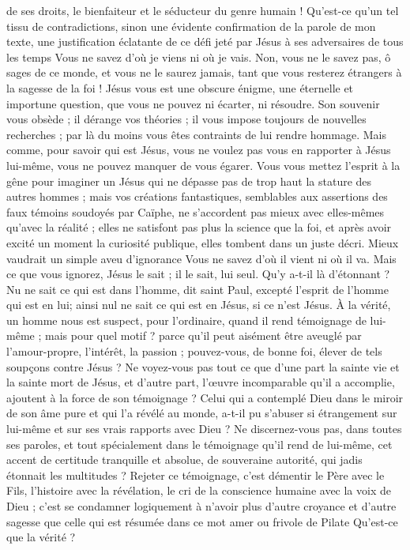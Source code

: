 de ses droits, le bienfaiteur et le séducteur du genre humain ! Qu’est-ce qu’un tel tissu de contradictions, sinon une évidente confirmation de la parole de mon texte, une justification éclatante de ce défi jeté par Jésus à ses adversaires de tous les temps\frcolon{} \Og{} Vous ne savez d’où je viens ni où je vais.\Fg{} Non, vous ne le savez pas, ô sages de ce monde, et vous ne le saurez jamais, tant que vous resterez étrangers à la sagesse de la foi ! Jésus vous est une obscure énigme, une éternelle et importune question, que vous ne pouvez ni écarter, ni résoudre. Son souvenir vous obsède ; il dérange vos théories ; il vous impose toujours de nouvelles recherches ; par là du moins vous êtes contraints de lui rendre hommage. Mais comme, pour savoir qui est Jésus, vous ne voulez pas vous en rapporter à Jésus lui-même, vous ne pouvez manquer de vous égarer. Vous vous mettez l’esprit à la gêne pour imaginer un Jésus qui ne dépasse pas de trop haut la stature des autres hommes ; mais vos créations fantastiques, semblables aux assertions des faux témoins soudoyés par Caïphe, ne s’accordent pas mieux avec elles-mêmes qu’avec la réalité ; elles ne satisfont pas plus la science que la foi, et après avoir excité un moment la curiosité publique, elles tombent dans un juste décri. Mieux vaudrait un simple aveu d’ignorance\frcolon{} Vous ne savez d’où il vient ni où il va. Mais ce que vous ignorez, Jésus le sait ; il le sait, lui seul. Qu’y a-t-il là d’étonnant ? \Og{} Nu ne sait ce qui est dans l’homme, dit saint Paul, excepté l’esprit de l’homme qui est en lui\Fg{}; ainsi nul ne sait ce qui est en Jésus, si ce n’est Jésus. À la vérité, un homme nous est suspect, pour l’ordinaire, quand il rend témoignage de lui-même ; mais pour quel motif ? parce qu’il peut aisément être aveuglé par l’amour-propre, l’intérêt, la passion ; pouvez-vous, de bonne foi, élever de tels soupçons contre Jésus ? Ne voyez-vous pas tout ce que d’une part la sainte vie et la sainte mort de Jésus, et d’autre part, l’œuvre incomparable qu’il a accomplie, ajoutent à la force de son témoignage ? Celui qui a contemplé Dieu dans le miroir de son âme pure et qui l’a révélé au monde, a-t-il pu s’abuser si étrangement sur lui-même et sur ses vrais rapports avec Dieu ? Ne discernez-vous pas, dans toutes ses paroles, et tout spécialement dans le témoignage qu’il rend de lui-même, cet accent de certitude tranquille et absolue, de souveraine autorité, qui jadis étonnait les multitudes ? Rejeter ce témoignage, c’est démentir le Père avec le Fils, l’histoire avec la révélation, le cri de la conscience humaine avec la voix de Dieu ; c’est se condamner logiquement à n’avoir plus d’autre croyance et d’autre sagesse que celle qui est résumée dans ce mot amer ou frivole de Pilate\frcolon{} \Og{} Qu’est-ce que la vérité ?\Fg{}


